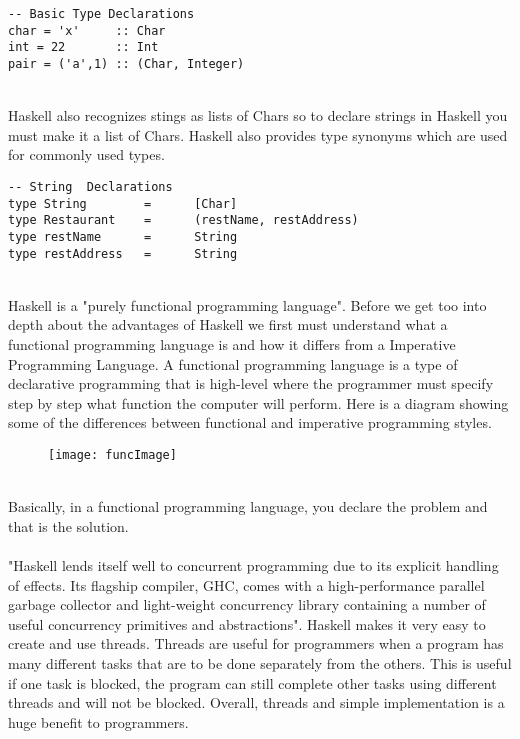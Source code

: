 \documentclass{article}
\begin{document}
\begin{lstlisting}
-- Basic Type Declarations
char = 'x'     :: Char
int = 22       :: Int
pair = ('a',1) :: (Char, Integer)
\end{lstlisting}
\\
Haskell also recognizes stings as lists of Chars so to declare strings in Haskell you must make it a list of Chars. Haskell also provides type synonyms which are used for commonly used types.
\\
\begin{lstlisting}
-- String  Declarations
type String        =      [Char]
type Restaurant    =      (restName, restAddress)
type restName      =      String
type restAddress   =      String
\end{lstlisting}
\\
Haskell is a "purely functional programming language". Before we get too into depth about the advantages of Haskell we first must understand what a functional programming language is and how it differs from a Imperative Programming Language. A functional programming language is a type of declarative programming that is high-level where the programmer must specify step by step what function the computer will perform. Here is a diagram showing some of the differences between functional and imperative programming styles.
\\
\begin{figure}[H]
    \centering
    \texttt{[image: funcImage]}

\end{figure}

\\
Basically, in a functional programming language, you declare the problem and that is the solution.
\\
\\

"Haskell lends itself well to concurrent programming due to its explicit handling of effects. Its flagship compiler, GHC, comes with a high-performance parallel garbage collector and light-weight concurrency library containing a number of useful concurrency primitives and abstractions". Haskell makes it very easy to create and use threads. Threads are useful for programmers when a program has many different tasks that are to be done separately from the others. This is useful if one task is blocked, the program can still complete other tasks using different threads and will not be blocked. Overall, threads and simple implementation is a huge benefit to programmers.
\end{document}
